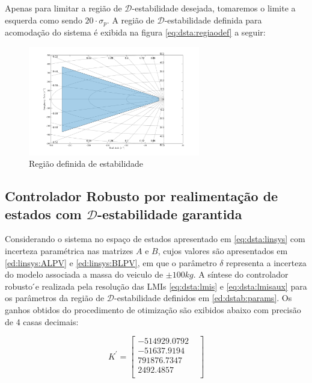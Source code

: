 Apenas para limitar a região de \( \mathcal{D}\)-estabilidade desejada, tomaremos o limite a esquerda como sendo $20\cdot\sigma_p$. A região de \( \mathcal{D}\)-estabilidade definida para acomodação do sistema é exibida na figura \eqref{eq:dsta:regiaodef} a seguir:

\FloatBarrier
\begin{figure}[htbp] 
  \begin{centering}
    \includegraphics[width=7.5cm]{img/regiao_d_estabilidade.png}
    \caption{Região definida de estabilidade}
    \label{eq:dsta:regiaodef}
  \end{centering}
\end{figure}
\FloatBarrier

\subsection{Controlador Robusto por realimentação de estados com \( \mathcal{D}\)-estabilidade garantida}
Considerando o sistema no espaço de estados apresentado em \eqref{eq:dsta:linsys} com incerteza paramétrica nas matrizes $A$ e $B$, cujos valores são apresentados em \eqref{ed:linsys:ALPV} e \eqref{ed:linsys:BLPV}, em que o parâmetro $\delta$ representa a incerteza do modelo associada a massa do veiculo de $\pm100kg$. A síntese do  controlador  robusto ́e  realizada  pela  resolução das LMIs \eqref{eq:dsta:lmis} e \eqref{eq:dsta:lmisaux} para os parâmetros da região de \( \mathcal{D}\)-estabilidade definidos em \eqref{ed:dstab:params}. Os ganhos obtidos do procedimento de otimização são exibidos abaixo com precisão de 4 casas decimais:

\begin{equation*} \label{eq:ganhoscontrolador}
    K^'=
    \begin{bmatrix}
        -514929.0792&\\	
        -51637.9194&\\	
        791876.7347&\\
        2492.4857&\\
    \end{bmatrix}
\end{equation*}

